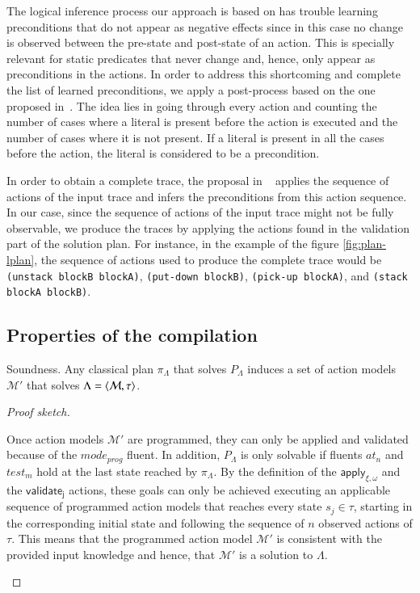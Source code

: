 The logical inference process our approach is based on has trouble learning preconditions that do not appear as negative effects since in this case no change is observed between the pre-state and post-state of an action. This is specially relevant for static predicates that never change and, hence, only appear as preconditions in the actions. In order to address this shortcoming and complete the list of learned preconditions, we apply a post-process based on the one proposed in~\cite{kuvcera2018louga}. The idea lies in going through every action and counting the number of cases where a literal is present before the action is executed and the number of cases where it is not present. If a literal is present in all the cases before the action, the literal is considered to be a precondition.

In order to obtain a complete trace, the proposal in ~\cite{kuvcera2018louga} applies the sequence of actions of the input trace and infers the preconditions from this \FO action sequence. In our case, since the sequence of actions of the input trace might not be fully observable, we produce the traces by applying the actions found in the validation part of the solution plan. For instance, in the example of the figure \ref{fig:plan-lplan}, the sequence of actions used to produce the complete trace would be {\tt{\small(unstack blockB blockA)}}, {\tt{\small(put-down blockB)}}, {\tt{\small(pick-up blockA)}}, and {\tt{\small(stack blockA blockB)}}.




\subsection{Properties of the compilation}
\label{properties}



\begin{mylemma}
Soundness. Any classical plan $\pi_\Lambda$ that solves $P_{\Lambda}$ induces a set of action models $\mathcal{M}'$ that solves $\Lambda={\langle \mathcal{M},\tau \rangle}$.
\end{mylemma}

\begin{proof}[Proof sketch]
\begin{small}
  Once action models $\mathcal{M}'$ are programmed, they can only be applied and validated because of the $mode_{prog}$ fluent. In addition, $P_{\Lambda}$ is only solvable if fluents {\tt\small $at_n$} and {\tt\small $test_m$} hold at the last state reached by $\pi_\Lambda$. By the definition of the $\mathsf{apply_{\xi,\omega}}$ and the $\mathsf{validate_{j}}$ actions, these goals can only be achieved executing an applicable sequence of programmed action models that reaches every state $s_j\in\tau$, starting in the corresponding initial state and following the sequence of $n$ observed actions of $\tau$. This means that the programmed action model $\mathcal{M}'$ is consistent with the provided input knowledge and hence, that $\mathcal{M}'$ is a solution to $\Lambda$.
\end{small}
\end{proof}


